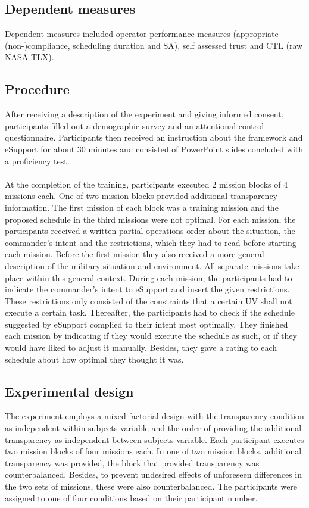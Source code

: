 \documentclass[twoside,twocolumn]{article}
\begin{document}
\subsection{Dependent measures}
Dependent measures included operator performance measures (appropriate (non-)compliance, scheduling duration and SA), self assessed trust and CTL (raw NASA-TLX). 

\subsection{Procedure}
After receiving a description of the experiment and giving informed consent, participants filled out a demographic survey and an attentional control questionnaire. Participants then received an instruction about the framework and eSupport for about 30 minutes and consisted of PowerPoint slides concluded with a proficiency test. 
\\\\
At the completion of the training, participants executed 2 mission blocks of 4 missions each. One of two mission blocks provided additional transparency information. The first mission of each block was a training mission and the proposed schedule in the third missions were not optimal. For each mission, the participants received a written partial operations order about the situation, the commander’s intent and the restrictions, which they had to read before starting each mission. Before the first mission they also received a more general description of the military situation and environment. All separate missions take place within this general context. During each mission, the participants had to indicate the commander’s intent to eSupport and insert the given restrictions. These restrictions only consisted of the constraints that a certain UV shall not execute a certain task. Thereafter, the participants had to check if the schedule suggested by eSupport complied to their intent most optimally. They finished each mission by indicating if they would execute the schedule as such, or if they would have liked to adjust it manually. Besides, they gave a rating to each schedule about how optimal they thought it was.

\subsection{Experimental design}
The experiment employs a mixed-factorial design with the transparency condition as independent within-subjects variable and the order of providing the additional transparency as independent between-subjects variable. Each participant executes two mission blocks of four missions each. In one of two mission blocks, additional transparency was provided, the block that provided transparency was counterbalanced.
Besides, to prevent undesired effects of unforeseen differences in the two sets of missions, these were also counterbalanced. The participants were assigned to one of four conditions based on their participant number.
\end{document}
